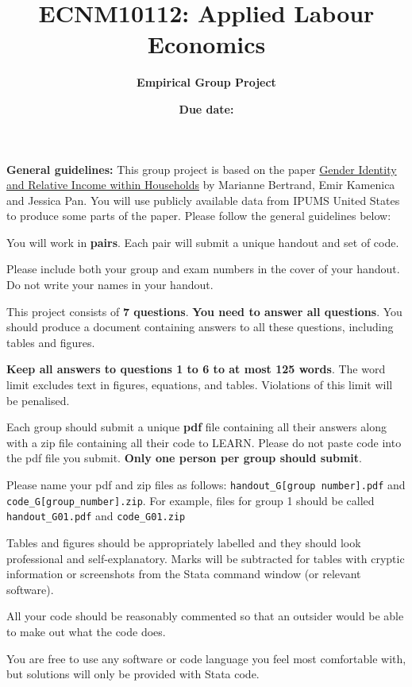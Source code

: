 \documentclass[a4paper, 11pt,addpoints,answers]{exam}
\title{\large{\textbf{ECNM10112: Applied Labour Economics}}}
\author{\textbf{Empirical Group Project}}
\date{\textbf{Due date:} \red{\textbf{Thursday,  7  November at 3 pm}}}
\begin{document}
\maketitle

\noindent\textbf{General guidelines:} This group project is based on the paper \href{https://academic.oup.com/qje/article/130/2/571/2330321}{Gender Identity and Relative Income within Households} by Marianne Bertrand, Emir Kamenica and Jessica Pan\nocite{Bertrand2015}. You will use publicly available data from IPUMS United States to produce some parts of the paper. Please follow the general guidelines below:

\bitem 
\item You will work in \textbf{pairs}. Each pair will submit a unique handout and set of code.
\item Please include both your group and exam numbers in the cover of your handout. Do not write your names in your handout.
\item This project consists of \textbf{7 questions}. \textbf{You need to answer all questions}. You should produce a document containing answers to all these questions, including tables and figures.
\item \textbf{Keep all answers to questions 1 to 6 to at most 125 words}. The word limit excludes text in figures, equations, and tables. Violations of this limit will be penalised.
\item Each group should submit a unique \textbf{pdf} file containing all their answers  along with a zip file containing all their code to LEARN. Please do not paste code into the pdf file you submit. \textbf{Only one person per group should submit}.
\item Please name your pdf and zip files as follows: {\tt handout\_G[group number].pdf} and \\ {\tt code\_G[group\_number].zip}. For example, files for group 1 should be called {\tt handout\_G01.pdf} and {\tt code\_G01.zip}
\item Tables and figures should be appropriately labelled and they should look professional and self-explanatory. Marks will be subtracted for tables with cryptic information or screenshots from the Stata  command window (or relevant software).
\item All your code should be reasonably commented so that an outsider would be able to make out what the code does.
\item You are free to use any software or code language you feel most comfortable with, but solutions will only be provided with Stata code.
\end{document}
